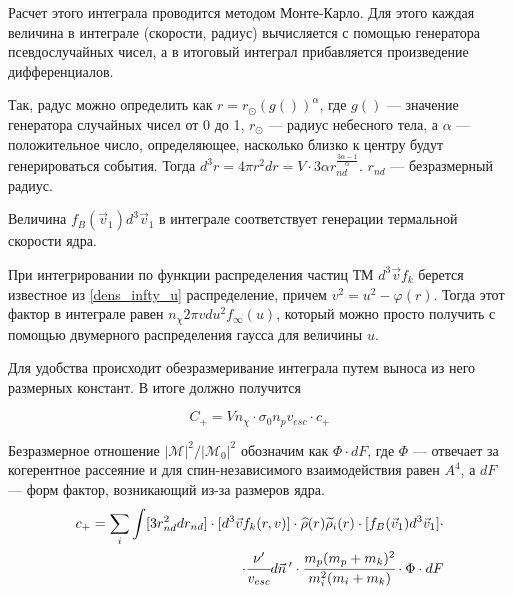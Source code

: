 Расчет этого интеграла проводится методом Монте-Карло. Для этого 
каждая величина в интеграле (скорости, радиус) вычисляется с помощью генератора 
псевдослучайных чисел, а в итоговый интеграл прибавляется произведение дифференциалов.

Так, радус можно определить как $r = r_{\odot}(g())^{\alpha}$, 
где $g()$ --- значение генератора случайных чисел от 0 до 1, $r_{\odot}$ --- радиус небесного тела, а $\alpha$ --- 
положительное число, определяющее, насколько близко к центру будут генерироваться 
события. Тогда $d^3r = 4\pi r^2dr = V \cdot 3 \alpha r_{nd}^{\frac{3\alpha-1}{\alpha}}$.
$r_{nd}$ --- безразмерный радиус.

Величина $f_{B}\left( {\vec{v}}_{1} \right)d^{3}{\vec{v}}_{1}$ в интеграле 
соответствует генерации термальной скорости ядра.

При интегрировании по функции распределения частиц ТМ $d^{3}\vec{v}f_{k}$ берется
известное из \ref{dens_infty_u} распределение, причем $v^2 = u^2 - \varphi(r)$. Тогда 
этот фактор в интеграле равен  $n_{\chi} 2\pi v du^2 f_{\infty}(u)$, который можно просто получить с помощью двумерного распределения гаусса для величины $u$.

Для удобства происходит обезразмеривание интеграла путем выноса из него размерных констант.
В итоге должно получится

\begin{equation}
	\label{capture_simple}
	C_+ = Vn_{\chi} \cdot \sigma_{0} n_p v_{esc} \cdot c_+
\end{equation}



Безразмерное отношение $\left| \mathcal{M} \right|^{2}/
\left| \mathcal{M}_0 \right|^{2}$ обозначим как $\Phi \cdot dF$, где $\Phi$ --- отвечает за когерентное рассеяние и для спин-независимого взаимодействия равен $A^4$, а $dF$ --- форм фактор, возникающий из-за размеров ядра.
\begin{equation}
\begin{split}
	\label{capture_nd}
	c_+ = \sum_i \int [3r_{nd}^2d r_{nd}]
	\cdot[d^3\vec{v} f_k(r,v)] \cdot 
	\widehat{\rho}(r) \widetilde{\rho}_i(r) 
	\cdot[f_{B}(\vec{v}_1) d^3\vec{v}_1] \cdot\\ 
	\cdot\cfrac{\nu'}{v_{esc}} d\vec{n}\,' \cdot
	\cfrac{m_{p} (m_p+m_k)^2}{m_i^2 ( m_i + m_k)}
	\cdot \Phi \cdot dF
\end{split}
\end{equation}

